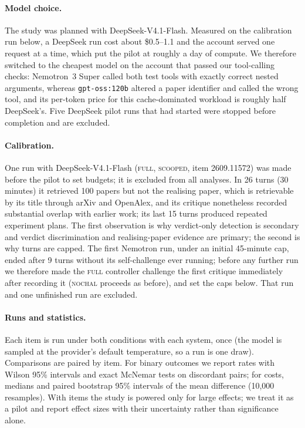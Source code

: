 \paragraph{Model choice.} The study was planned with DeepSeek-V4.1-Flash. Measured on the calibration run below, a DeepSeek run cost about \$0.5--1.1 and the account served one request at a time, which put the pilot at roughly a day of compute. We therefore switched to the cheapest model on the account that passed our tool-calling checks: Nemotron~3 Super called both test tools with exactly correct nested arguments, whereas \texttt{gpt-oss:120b} altered a paper identifier and called the wrong tool, and its per-token price for this cache-dominated workload is roughly half DeepSeek's. Five DeepSeek pilot runs that had started were stopped before completion and are excluded.

\paragraph{Calibration.} One run with DeepSeek-V4.1-Flash (\textsc{full}, \textsc{scooped}, item 2609.11572) was made before the pilot to set budgets; it is excluded from all analyses. In 26 turns (30 minutes) it retrieved 100 papers but not the realising paper, which is retrievable by its title through arXiv and OpenAlex, and its critique nonetheless recorded substantial overlap with earlier work; its last 15 turns produced repeated experiment plans. The first observation is why verdict-only detection is secondary and verdict discrimination and realising-paper evidence are primary; the second is why turns are capped. The first Nemotron run, under an initial 45-minute cap, ended after 9 turns without its self-challenge ever running; before any further run we therefore made the \textsc{full} controller challenge the first critique immediately after recording it (\textsc{nochal} proceeds as before), and set the caps below. That run and one unfinished run are excluded.

\paragraph{Runs and statistics.} Each item is run under both conditions with each system, once (the model is sampled at the provider's default temperature, so a run is one draw). Comparisons are paired by item. For binary outcomes we report rates with Wilson 95\% intervals and exact McNemar tests on discordant pairs; for costs, medians and paired bootstrap 95\% intervals of the mean difference (10{,}000 resamples). With \PilotItems{} items the study is powered only for large effects; we treat it as a pilot and report effect sizes with their uncertainty rather than significance alone.
